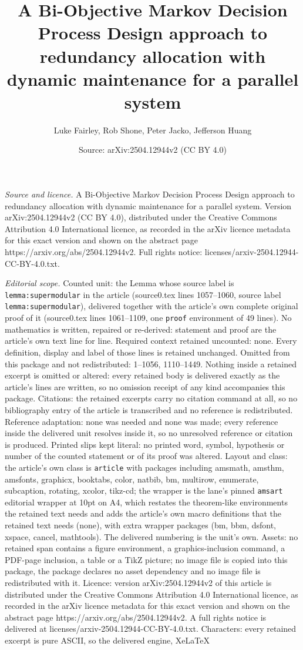 \documentclass[10pt,a4paper]{amsart}
\title[A Bi-Objective Markov Decision Process Design approach to re]{A Bi-Objective Markov Decision Process Design approach to redundancy allocation with dynamic maintenance for a parallel system}
\author{Luke Fairley, Rob Shone, Peter Jacko, Jefferson Huang}
\date{Source: arXiv:2504.12944v2 (CC BY 4.0)}
\begin{document}
\maketitle

\noindent\emph{Source and licence.} A Bi-Objective Markov Decision Process Design approach to redundancy allocation with dynamic maintenance for a parallel system. Version arXiv:2504.12944v2 (CC BY 4.0), distributed under the Creative Commons Attribution 4.0 International licence, as recorded in the arXiv licence metadata for this exact version and shown on the abstract page https://arxiv.org/abs/2504.12944v2. Full rights notice: licenses/arxiv-2504.12944-CC-BY-4.0.txt.\par\smallskip

\noindent\textit{Editorial scope.} Counted unit: the Lemma whose source label is \texttt{lemma:supermodular} in the article (source0.tex lines 1057--1060, source label \texttt{lemma:supermodular}), delivered together with the article's own complete original proof of it (source0.tex lines 1061--1109, one \texttt{proof} environment of 49 lines). No mathematics is written, repaired or re-derived: statement and proof are the article's own text line for line. Required context retained uncounted: none. Every definition, display and label of those lines is retained unchanged. Omitted from this package and not redistributed: 1--1056, 1110--1449. Nothing inside a retained excerpt is omitted or altered: every retained body is delivered exactly as the article's lines are written, so no omission receipt of any kind accompanies this package. Citations: the retained excerpts carry no citation command at all, so no bibliography entry of the article is transcribed and no reference is redistributed. Reference adaptation: none was needed and none was made; every reference inside the delivered unit resolves inside it, so no unresolved reference or citation is produced. Printed slips kept literal: no printed word, symbol, hypothesis or number of the counted statement or of its proof was altered. Layout and class: the article's own class is \texttt{article} with packages including amsmath, amsthm, amsfonts, graphicx, booktabs, color, natbib, bm, multirow, enumerate, subcaption, rotating, xcolor, tikz-cd; the wrapper is the lane's pinned \texttt{amsart} editorial wrapper at 10pt on A4, which restates the theorem-like environments the retained text needs and adds the article's own macro definitions that the retained text needs (none), with extra wrapper packages (bm, bbm, dsfont, xspace, cancel, mathtools). The delivered numbering is the unit's own. Assets: no retained span contains a figure environment, a graphics-inclusion command, a PDF-page inclusion, a table or a TikZ picture; no image file is copied into this package, the package declares no asset dependency and no image file is redistributed with it. Licence: version arXiv:2504.12944v2 of this article is distributed under the Creative Commons Attribution 4.0 International licence, as recorded in the arXiv licence metadata for this exact version and shown on the abstract page https://arxiv.org/abs/2504.12944v2. A full rights notice is delivered at licenses/arxiv-2504.12944-CC-BY-4.0.txt. Characters: every retained excerpt is pure ASCII, so the delivered engine, XeLaTeX 
\end{document}
